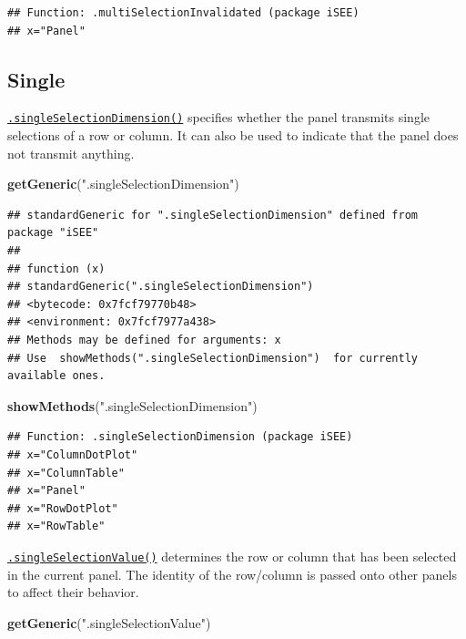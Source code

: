 \documentclass[
]{book}
\newenvironment{Shaded}{\begin{snugshade}}{\end{snugshade}}
\newcommand{\KeywordTok}[1]{\textcolor[rgb]{0.13,0.29,0.53}{\textbf{#1}}}
\newcommand{\NormalTok}[1]{#1}
\newcommand{\StringTok}[1]{\textcolor[rgb]{0.31,0.60,0.02}{#1}}
\begin{document}
\begin{verbatim}
## Function: .multiSelectionInvalidated (package iSEE)
## x="Panel"
\end{verbatim}

\hypertarget{single}{%
\subsection{Single}\label{single}}

\href{https://isee.github.io/iSEE/reference/single-select-generics.html}{\texttt{.singleSelectionDimension()}} specifies whether the panel transmits single selections of a row or column.
It can also be used to indicate that the panel does not transmit anything.

\begin{Shaded}
\begin{Highlighting}[]
\KeywordTok{getGeneric}\NormalTok{(}\StringTok{".singleSelectionDimension"}\NormalTok{)}
\end{Highlighting}
\end{Shaded}

\begin{verbatim}
## standardGeneric for ".singleSelectionDimension" defined from package "iSEE"
## 
## function (x) 
## standardGeneric(".singleSelectionDimension")
## <bytecode: 0x7fcf79770b48>
## <environment: 0x7fcf7977a438>
## Methods may be defined for arguments: x
## Use  showMethods(".singleSelectionDimension")  for currently available ones.
\end{verbatim}

\begin{Shaded}
\begin{Highlighting}[]
\KeywordTok{showMethods}\NormalTok{(}\StringTok{".singleSelectionDimension"}\NormalTok{)}
\end{Highlighting}
\end{Shaded}

\begin{verbatim}
## Function: .singleSelectionDimension (package iSEE)
## x="ColumnDotPlot"
## x="ColumnTable"
## x="Panel"
## x="RowDotPlot"
## x="RowTable"
\end{verbatim}

\href{https://isee.github.io/iSEE/reference/single-select-generics.html}{\texttt{.singleSelectionValue()}} determines the row or column that has been selected in the current panel.
The identity of the row/column is passed onto other panels to affect their behavior.

\begin{Shaded}
\begin{Highlighting}[]
\KeywordTok{getGeneric}\NormalTok{(}\StringTok{".singleSelectionValue"}\NormalTok{)}
\end{Highlighting}
\end{Shaded}
\end{document}
